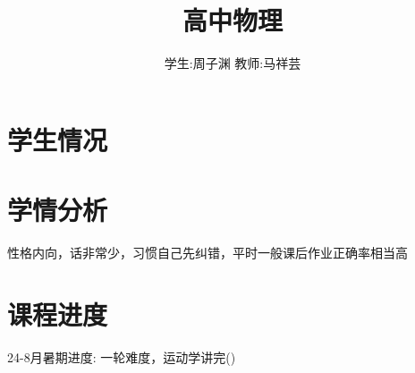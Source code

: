 \documentclass{article}
\title{高中物理}
\author{学生:\quad 周子渊 \quad 教师:\quad 马祥芸}
\begin{document}
\maketitle
\tableofcontents
\newpage
{}

\section{学生情况}
\begin{center}
\end{center}

\section{学情分析}
性格内向，话非常少，习惯自己先纠错，平时一般课后作业正确率相当高

\vspace{2em}

\section{课程进度}
24-8月暑期进度: 一轮难度，运动学讲完()
\end{document}

